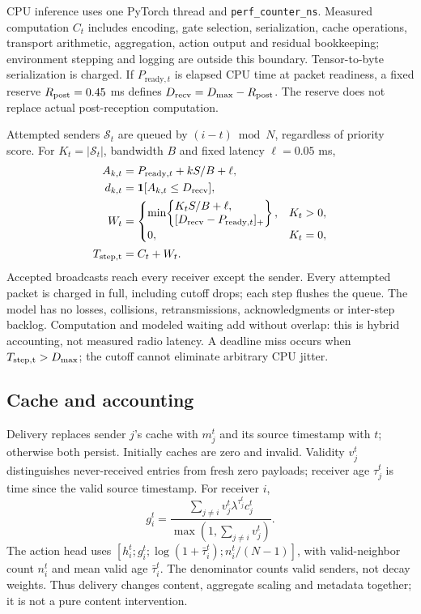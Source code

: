 \documentclass[a4paper,fleqn]{cas-dc}
\newcommand{\ind}{\mathbf{1}}
\begin{document}
CPU inference uses one PyTorch thread and \texttt{perf\_counter\_ns}. Measured computation $C_t$ includes encoding, gate selection, serialization, cache operations, transport arithmetic, aggregation, action output and residual bookkeeping; environment stepping and logging are outside this boundary. Tensor-to-byte serialization is charged. If $P_{\mathrm{ready},t}$ is elapsed CPU time at packet readiness, a fixed reserve $R_{\rm post}=0.45$ ms defines $D_{\rm recv}=D_{\max}-R_{\rm post}$. The reserve does not replace actual post-reception computation.

Attempted senders $\mathcal S_t$ are queued by $(i-t)\bmod N$, regardless of priority score. For $K_t=|\mathcal S_t|$, bandwidth $B$ and fixed latency $\ell=0.05$ ms,
\begin{align}
 A_{k,t}&=P_{\mathrm{ready},t}+kS/B+\ell,\nonumber\\ d_{k,t}&=\ind[A_{k,t}\le D_{\rm recv}],\\
 W_t&=\begin{cases}\min\!\left\{\begin{aligned}&K_tS/B+\ell,\\&[D_{\rm recv}-P_{\mathrm{ready},t}]_+\end{aligned}\right\},&K_t>0,\\0,&K_t=0,\end{cases}\\
 T_{\rm step,t}&=C_t+W_t.\label{eq:step}
\end{align}
Accepted broadcasts reach every receiver except the sender. Every attempted packet is charged in full, including cutoff drops; each step flushes the queue. The model has no losses, collisions, retransmissions, acknowledgments or inter-step backlog. Computation and modeled waiting add without overlap: this is hybrid accounting, not measured radio latency. A deadline miss occurs when $T_{\rm step,t}>D_{\max}$; the cutoff cannot eliminate arbitrary CPU jitter.

\subsection{Cache and accounting}
Delivery replaces sender $j$'s cache with $m_j^t$ and its source timestamp with $t$; otherwise both persist. Initially caches are zero and invalid. Validity $v_j^t$ distinguishes never-received entries from fresh zero payloads; receiver age $\tau_j^t$ is time since the valid source timestamp. For receiver $i$,
\begin{equation}
 g_i^t=\frac{\sum_{j\ne i}v_j^t\lambda^{\tau_j^t}c_j^t}{\max(1,\sum_{j\ne i}v_j^t)}.
\end{equation}
The action head uses $[h_i^t;g_i^t;\log(1+\bar\tau_i^t);n_i^t/(N-1)]$, with valid-neighbor count $n_i^t$ and mean valid age $\bar\tau_i^t$. The denominator counts valid senders, not decay weights. Thus delivery changes content, aggregate scaling and metadata together; it is not a pure content intervention.
\end{document}
